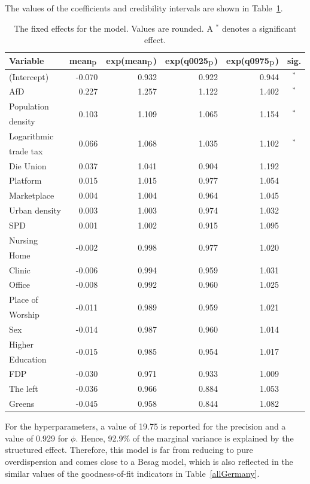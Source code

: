 The values of the coefficients and credibility intervals are shown in Table~\ref{FixedAllGermany_spatial}.
\begin{table}[H]
\caption{The fixed effects for the model. Values are rounded. A $^*$ denotes a significant effect. \label{FixedAllGermany_spatial}}
\begin{tabular}{l r r r r c}
\toprule
\textbf{Variable}	& \textbf{mean$_{\hbox{p}}$}	& \textbf{exp(mean$_{\hbox{p}}$)} & \textbf{exp(q0025$_{\hbox{p}}$)} & \textbf{exp(q0975$_{\hbox{p}}$)} & \textbf{sig.}\\
\midrule
(Intercept) & -0.070 & 0.932 & 0.922 & 0.944 & $^*$\\
AfD & 0.227 & 1.257 & 1.122 & 1.402 & $^*$\\
Population & \multirow{2}{*}{0.103} & \multirow{2}{*}{1.109} & \multirow{2}{*}{1.065} & \multirow{2}{*}{1.154} & \multirow{2}{*}{$^*$}\\
density \\
Logarithmic & \multirow{2}{*}{0.066} & \multirow{2}{*}{1.068} & \multirow{2}{*}{1.035} & \multirow{2}{*}{1.102} & \multirow{2}{*}{$^*$}\\
trade tax \\
Die Union & 0.037 & 1.041 & 0.904 & 1.192\\
Platform & 0.015 & 1.015 & 0.977 & 1.054 \\
Marketplace & 0.004 & 1.004 & 0.964 & 1.045 \\
Urban density & 0.003 & 1.003 & 0.974 & 1.032 \\
SPD & 0.001 & 1.002 & 0.915 & 1.095\\
Nursing& \multirow{2}{*}{-0.002} & \multirow{2}{*}{0.998} & \multirow{2}{*}{0.977} & \multirow{2}{*}{1.020} \\
Home\\
Clinic & -0.006 & 0.994 & 0.959 & 1.031 \\
Office & -0.008 & 0.992 & 0.960 & 1.025 \\
Place of & \multirow{2}{*}{-0.011} & \multirow{2}{*}{0.989} & \multirow{2}{*}{0.959} & \multirow{2}{*}{1.021} \\
Worship\\
Sex & -0.014 & 0.987 & 0.960 & 1.014 & \\
Higher & \multirow{2}{*}{-0.015} & \multirow{2}{*}{0.985} & \multirow{2}{*}{0.954} & \multirow{2}{*}{1.017} \\
Education\\
FDP & -0.030 & 0.971 & 0.933& 1.009 \\
The left & -0.036 & 0.966 & 0.884 & 1.053\\
Greens & -0.045 & 0.958 & 0.844 & 1.082 \\
\bottomrule
\end{tabular}
\end{table}
For the hyperparameters, a value of 19.75 is reported for the precision and a value of 0.929 for $\phi$. Hence, 92.9\% of the marginal variance is explained by the structured effect. Therefore, this model is far from reducing to pure overdispersion and comes close to a Besag model, which is also reflected in the similar values of the goodness-of-fit indicators in Table~\ref{allGermany}.
